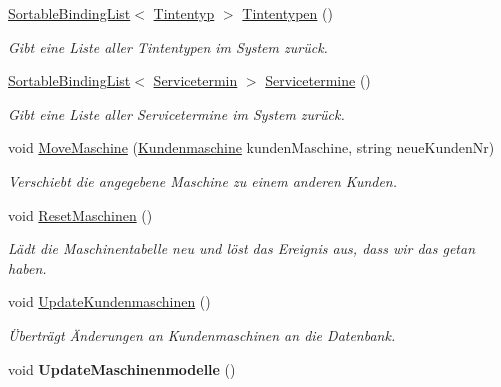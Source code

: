 \begin{DoxyCompactItemize}
\item 
\hyperlink{class_products_1_1_common_1_1_sortable_binding_list}{Sortable\+Binding\+List}$<$ \hyperlink{class_products_1_1_model_1_1_entities_1_1_tintentyp}{Tintentyp} $>$ \hyperlink{class_products_1_1_model_1_1_model_service_a47daf4d803aa50d2e6b1cda1552fe4d3}{Tintentypen} ()
\begin{DoxyCompactList}\small\item\em Gibt eine Liste aller Tintentypen im System zurück. \end{DoxyCompactList}\item 
\hyperlink{class_products_1_1_common_1_1_sortable_binding_list}{Sortable\+Binding\+List}$<$ \hyperlink{class_products_1_1_model_1_1_entities_1_1_servicetermin}{Servicetermin} $>$ \hyperlink{class_products_1_1_model_1_1_model_service_ac409691b725b364c8b8b2b9d327ac8be}{Servicetermine} ()
\begin{DoxyCompactList}\small\item\em Gibt eine Liste aller Servicetermine im System zurück. \end{DoxyCompactList}\item 
void \hyperlink{class_products_1_1_model_1_1_model_service_a07a07e1d3239d340f8560941e3f08056}{Move\+Maschine} (\hyperlink{class_products_1_1_model_1_1_entities_1_1_kundenmaschine}{Kundenmaschine} kunden\+Maschine, string neue\+Kunden\+Nr)
\begin{DoxyCompactList}\small\item\em Verschiebt die angegebene Maschine zu einem anderen Kunden. \end{DoxyCompactList}\item 
void \hyperlink{class_products_1_1_model_1_1_model_service_af624fc25550a7158ad29ee1b3f555796}{Reset\+Maschinen} ()
\begin{DoxyCompactList}\small\item\em Lädt die Maschinentabelle neu und löst das Ereignis aus, dass wir das getan haben. \end{DoxyCompactList}\item 
void \hyperlink{class_products_1_1_model_1_1_model_service_ab0553fb07e526f6ea15b77428d3e2976}{Update\+Kundenmaschinen} ()
\begin{DoxyCompactList}\small\item\em Überträgt Änderungen an Kundenmaschinen an die Datenbank. \end{DoxyCompactList}\item 
void {\bfseries Update\+Maschinenmodelle} ()\hypertarget{class_products_1_1_model_1_1_model_service_a9af7954aa3fdf56e6a32600c6d4106c3}{}\label{class_products_1_1_model_1_1_model_service_a9af7954aa3fdf56e6a32600c6d4106c3}


\end{DoxyCompactItemize}
